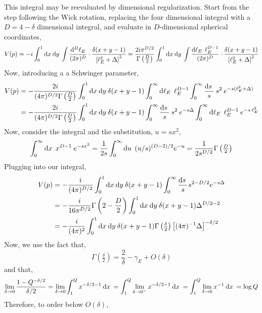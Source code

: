 \documentclass[12pt]{extarticle}
\begin{document}
This integral may be reevaluated by dimensional regularization. Start from the step following the Wick rotation, replacing the four dimensional integral with a $D = 4 - \delta$ dimensional integral, and evaluate in $D$-dimensional spherical coordinates,
\[ V(p) = -i \int_{0}^{1} \mathrm{d}x \: \mathrm{d}y \: \int \frac{\mathrm{d}^{D} \ell_E}{(2\pi)^D} \cdot \frac{\delta(x + y - 1)}{\left[\ell_E^2 + \Delta \right]^2} = \frac{2i \pi^{D/2}}{\Gamma \left(\frac{D}{2}\right)} \int_{0}^{1} \mathrm{d}x \: \mathrm{d}y \: \int \frac{\mathrm{d}\ell_E \: \: \ell_E^{D-1}}{(2\pi)^D} \cdot \frac{\delta(x + y - 1)}{\left[\ell_E^2 + \Delta \right]^2} \]
Now, introducing a a Schwinger parameter,
\begin{align*}
V(p) & = -\frac{2i}{(4 \pi)^{D/2} \Gamma \left(\frac{D}{2}\right)} \int_{0}^{1} \mathrm{d}x \: \mathrm{d}y \: \delta(x + y - 1) \int_0^\infty \mathrm{d}\ell_E \: \: \ell_E^{D-1} \int_0^\infty \frac{\mathrm{d}s \:}{s} \: s^2 \: e^{-s (\ell_E^2 + \Delta)} 
\\
& = -\frac{2i}{(4 \pi)^{D/2} \Gamma \left(\frac{D}{2}\right)} \int_{0}^{1} \mathrm{d}x \: \mathrm{d}y \: \delta(x + y - 1) \int_0^\infty \frac{\mathrm{d}s \:}{s} \: s^2 \: e^{- s \Delta} \int_0^\infty \mathrm{d}\ell_E \: \: \ell_E^{D-1}  \: e^{-s \: \ell_E^2} 
\end{align*}
Now, consider the integral and the substitution, $u = s x^2$, 
\begin{align*}
\int_0^\infty \mathrm{d}x \: \: x^{D-1} \: e^{-s x^2} = \frac{1}{2s} \int_{0}^\infty \mathrm{d}u \: \: (u/s)^{(D-2)/2} e^{-u} = \frac{1}{2 s^{D/2}} \Gamma\left(\tfrac{D}{2}\right)  
\end{align*}
Plugging into our integral,
\begin{align*}
V(p) & = - \frac{i}{(4 \pi)^{D/2}} \int_{0}^{1} \mathrm{d}x \: \mathrm{d}y \: \delta(x + y - 1) \int_0^\infty \frac{\mathrm{d}s \:}{s} s^{2 - D/2} e^{-s \Delta}
\\
& = -\frac{i}{16 \pi^{D/2}} \Gamma\left(2 - \frac{D}{2} \right) \int_{0}^{1} \mathrm{d}x \: \mathrm{d}y \: \delta(x + y - 1) \Delta^{D/2 - 2} 
\\
& = - \frac{i}{(4 \pi)^2} \int_{0}^{1} \mathrm{d}x \: \mathrm{d}y \: \delta(x + y - 1) \Gamma\left(\tfrac{\delta}{2}\right) \left[(4 \pi)^{-1} \Delta \right]^{- \delta / 2}
\end{align*}
Now, we use the fact that,
\[ \Gamma\left(\tfrac{\delta}{2}\right) = \frac{2}{\delta} - \gamma_E + O(\delta) \]
and that,
\[ \lim\limits_{\delta \to 0} \frac{1 - Q^{-\delta/2}}{\delta/2} =  \lim\limits_{\delta \to 0} \int_1^Q x^{-\delta/2 - 1} \: \mathrm{d}x \: = \int_1^Q \lim\limits_{\delta \to 0^-} x^{-\delta/2 - 1} \: \mathrm{d}x \:  = \int_1^Q \lim\limits_{\delta \to 0} x^{- 1} \: \mathrm{d}x \: = \log{Q} \]
Therefore, to order below $O(\delta)$,
\end{document}
